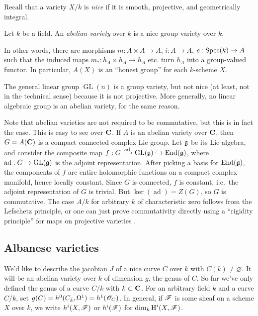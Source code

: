 Recall that a variety $X/k$ is \emph{nice} if it is smooth, projective, and 
geometrically integral. 

\begin{definition}
Let $k$ be a field. An \emph{abelian variety} over $k$ is a nice group variety 
over $k$.
\end{definition}

In other words, there are morphisms $m:A\times A\to A$, $i:A\to A$, 
$e:\operatorname{Spec}(k)\to A$ such that the induced maps $m_*:h_A\times h_A\to h_A$ etc. 
turn $h_A$ into a group-valued functor. In particular, $A(X)$ is an ``honest  
group'' for each $k$-scheme $X$. 

\begin{example}
The general linear group $\operatorname{GL}(n)$ is a group variety, but not 
nice (at least, not in the technical sense) because it is not projective. More 
generally, no linear algebraic group is an abelian variety, for the same 
reason. 
\end{example}

Note that abelian varieties are not required to be commutative, but this is in 
fact the case. This is easy to see over $\mathbf{C}$. If $A$ is an 
abelian variety over $\mathbf{C}$, then $G=A(\mathbf{C})$ is a compact connected complex Lie 
group. Let $\mathfrak{g}$ be its Lie algebra, and consider the composite map 
$f:G\xrightarrow{\text{ad}}\operatorname{GL}(\mathfrak{g}) \hookrightarrow 
\operatorname{End}(\mathfrak{g})$, where 
$\operatorname{ad}:G\to\operatorname{GL}(\mathfrak{g})$ is the adjoint 
representation. After picking a basis for $\operatorname{End}(\mathfrak{g})$, 
the components of $f$ are entire holomorphic functions on a compact complex 
manifold, hence locally constant. Since $G$ is connected, $f$ is constant, 
i.e.~the adjoint representation of $G$ is trivial. But 
$\ker(\operatorname{ad}) = Z(G)$, so $G$ is commutative.
The case $A/k$ for arbitrary $k$ of characteristic zero 
follows from the Lefschetz principle, or one can just prove commutativity 
directly using a ``rigidity principle'' for maps on projective varieties
\cite[I.1.4]{mi-av}. 





\subsection{Albanese varieties}

We'd like to describe the jacobian $J$ of a nice curve $C$ over $k$ with 
$C(k)\ne\varnothing$. It will be an abelian variety over $k$ of dimension 
$g$, the genus of $C$. So far we've only defined the genus of a curve $C/k$ with 
$k\subset \mathbf{C}$. For an arbitrary field $k$ and a curve $C/k$, set 
$g(C)=h^0(C_{\bar k},\Omega^1) = h^1(\mathscr{O}_C)$. In general, if $\mathscr{F}$ is some 
sheaf on a scheme $X$ over $k$, we write $h^i(X,\mathscr{F})$ or $h^i(\mathscr{F})$ for 
$\dim_k \operatorname{H}^i(X,\mathscr{F})$.

